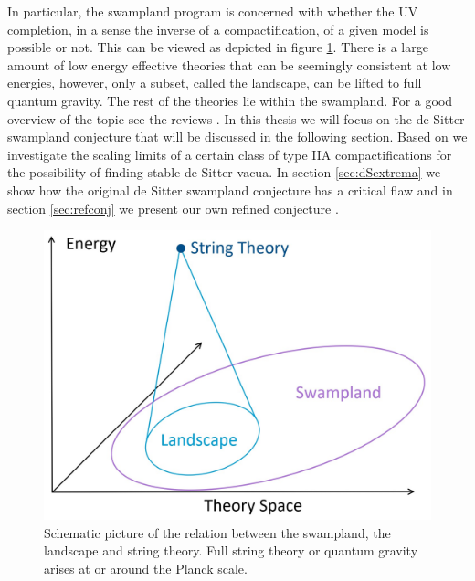 \documentclass[a4paper,12pt]{report}
\begin{document}
In particular, the swampland program is concerned with whether the UV completion, in a sense the inverse of a compactification, of a given model is possible or not. This can be viewed as depicted in figure \ref{fig:swamppic}. There is a large amount of low energy effective theories that can be seemingly consistent at low energies, however, only a subset, called the landscape, can be lifted to full quantum gravity. The rest of the theories lie within the swampland. For a good overview of the topic see the reviews \cite{Brennan:2017rbf,Palti:2019pca,vanBeest:2021lhn}. In this thesis we will focus on the de Sitter swampland conjecture that will be discussed in the following section. Based on \cite{Banlaki:2018ayh} we investigate the scaling limits of a certain class of type IIA compactifications for the possibility of finding stable de Sitter vacua. In section \ref{sec:dSextrema} we show how the original de Sitter swampland conjecture has a critical flaw \cite{Roupec:2018mbn} and in section \ref{sec:refconj} we present our own refined conjecture \cite{Andriot:2018mav}.
\begin{figure}[htb]
     \centering
     \includegraphics[scale=0.7]{swamppic.jpg}
     \caption{Schematic picture of the relation between the swampland, the landscape and string theory. Full string theory or quantum gravity arises at or around the Planck scale.}
     \label{fig:swamppic}
\end{figure}
\end{document}

